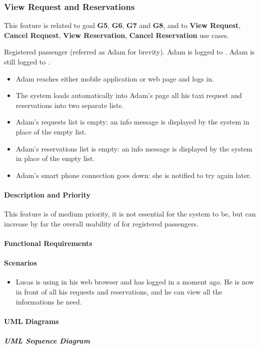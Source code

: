 \subsubsection{View Request and Reservations}
This feature is related to goal \textbf{G5}, \textbf{G6}, \textbf{G7} and \textbf{G8}, and to \textbf{View Request}, \textbf{Cancel Request}, \textbf{View Reservation}, \textbf{Cancel Reservation} use cases.
\begin{itemize}
	 Registered passenger (referred as Adam for brevity).
	 Adam is logged to \myTaxiService{}.
	 Adam is still logged to \myTaxiService{}.
	\begin{itemize}
		\item Adam reaches either \myTaxiService{} mobile application or web page and logs in.
		\item The system loads automatically into Adam's page all his taxi request and reservations into two separate lists.
	\end{itemize}
	\begin{itemize}
		\item Adam's requests list is empty: an info message is displayed by the system in place of the empty list.
		\item Adam's reservations list is empty: an info message is displayed by the system in place of the empty list.
		\item Adam's smart phone connection goes down: she is notified to try again later.
	\end{itemize}
\end{itemize}
\paragraph{Description and Priority}
This feature is of medium priority, it is not essential for the system to be, but can increase by far the overall usability of \myTaxiService{} for registered passengers.\par
\paragraph{Functional Requirements}
\begin{itemize}
\end{itemize}
\paragraph{Scenarios}
\begin{itemize}
	\item Lucas is using \myTaxiService{} in his web browser and has logged in a moment ago.
	He is now in front of all his requests and reservations, and he can view all the informations he need.
\end{itemize}
\paragraph{UML Diagrams}
\subparagraph{UML Sequence Diagram}
